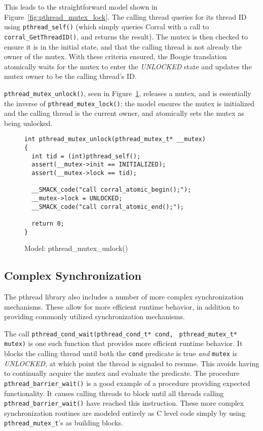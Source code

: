 This leads to the straightforward model shown in
Figure~\ref{fig:pthread_mutex_lock}. The calling thread queries for
its thread ID using \lstinline|pthread_self()| (which simply queries
Corral with a call to \lstinline|corral_GetThreadID()|, and returns
the result). The mutex is then checked to ensure it is in the initial
state, and that the calling thread is not already the owner of the 
mutex.  With these criteria ensured, the Boogie translation atomically
waits for the mutex to enter the \emph{UNLOCKED} state and updates the
mutex owner to be the calling thread's ID.

\lstinline|pthread_mutex_unlock()|, seen in
Figure~\ref{fig:pthread_mutex_unlock}, releases a mutex, and is
essentially the inverse of \lstinline|pthread_mutex_lock()|; the model
ensures the mutex is initialized and the calling thread is the current
owner, and atomically sets the mutex as being unlocked. 

\begin{figure}[!ht]
\centering
\begin{lstlisting}
int pthread_mutex_unlock(pthread_mutex_t* __mutex)
{
  int tid = (int)pthread_self();
  assert(__mutex->init == INITIALIZED);
  assert(__mutex->lock == tid);

  __SMACK_code("call corral_atomic_begin();");
  __mutex->lock = UNLOCKED;
  __SMACK_code("call corral_atomic_end();");

  return 0;
}
\end{lstlisting}
\caption{Model: pthread\_mutex\_unlock()}
\label{fig:pthread_mutex_unlock}
\end{figure}

\subsection{Complex Synchronization}
The pthread library also includes a number of more complex
synchronization mechanisms.  These allow for more efficient runtime
behavior, in addition to providing commonly utilized synchronization
mechanisms.

The call \lstinline|pthread_cond_wait(pthread_cond_t* cond, |
\lstinline|pthread_mutex_t* mutex)|  is one such function that
provides more efficient runtime behavior.  It blocks the calling
thread until both the \lstinline|cond| predicate is true \emph{and}
\lstinline|mutex| is \emph{UNLOCKED}, at which point the thread is
signaled to resume. This avoids having to continually acquire the
mutex and evaluate the predicate.  The procedure
\lstinline|pthread_barrier_wait()| is a good example of a procedure
providing expected functionality.  It causes calling threads to block
until all threads calling \lstinline|pthread_barrier_wait()| have
reached this instruction. These more complex synchronization routines
are modeled entirely as C level code simply by using
\lstinline|pthread_mutex_t|'s as building blocks. 

